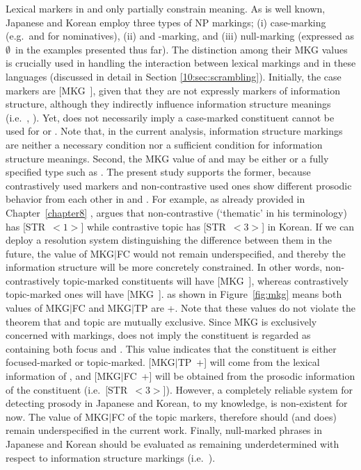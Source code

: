 Lexical markers in  and  only partially
constrain meaning. As is well known, Japanese and Korean employ three
types of NP markings; (i) case-marking (e.g.\ \ga and \ika for
nominatives), (ii) \wa and \onun-marking, and (iii) null-marking
(expressed as \ensuremath{\emptyset}~in the examples presented thus far). The distinction among their MKG values is crucially used in
handling the interaction between lexical markings and 
in these languages (discussed in detail in Section \ref{10:sec:scrambling}).
Initially, the case markers are \mbox{[MKG ]},
given that they are not expressly markers of information structure,
although they indirectly influence information structure meanings
(i.e.\ , \citealt{heycock:94}). Yet,  does
not necessarily imply a case-marked constituent cannot be used for
 or . Note that, in the current analysis,
information structure markings are neither a necessary condition nor a
sufficient condition for information structure meanings.  Second, the
MKG value of \wa and \nun may be either  or a fully specified
type such as . The present study supports the former,
because contrastively used markers and non-contrastive used ones show
different prosodic behavior from each other in  and
 \citep{chang:02,nakanishi:07}.  For example, as already
provided in Chapter~\ref{chapter8} ,
\citet{chang:02} argues that non-contrastive (`thematic' in his
terminology)  has \mbox{[STR \ensuremath{<1>}]} while
contrastive topic has \mbox{[STR \ensuremath{<3>}]} in
Korean. If we can deploy a resolution system
distinguishing the difference between them in the future, the value of
\mbox{MKG{$\mid$}FC} would not remain underspecified, and thereby the
information structure will be more concretely
constrained. In other words, non-contrastively
topic-marked constituents will have \mbox{[MKG ]},
whereas contrastively topic-marked ones will have \mbox{[MKG
    ]}.  as shown in Figure~\ref{fig:mkg}
means both values of MKG{$\mid$}FC and MKG{$\mid$}TP are +. Note that
these values do not violate the theorem that  and topic are
mutually exclusive.  Since MKG is exclusively concerned with markings,
 does not imply the constituent is regarded as containing
both focus and .  This value indicates that the constituent
is either focused-marked or topic-marked.  \mbox{[MKG{$\mid$}TP +]}
will come from the lexical information of \nun, and
\mbox{[MKG{$\mid$}FC +]} will be obtained from the prosodic
information of the constituent (i.e.\ \mbox{[STR
    \ensuremath{<3>}]}). However, a completely reliable
system for detecting prosody in Japanese and Korean, to my knowledge,
is non-existent for now.  The value of MKG{$\mid$}FC of the topic
markers, therefore should (and does) remain underspecified in the
current work.  Finally, null-marked phrases in Japanese and Korean
should be evaluated as remaining underdetermined with respect to
information structure markings
(i.e.\ ).




